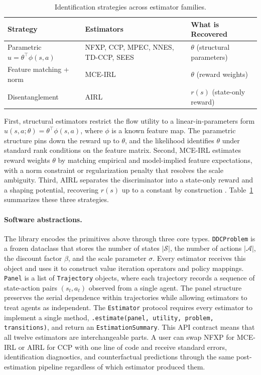 \begin{table}[H]
\centering
\small
\caption{Identification strategies across estimator families.}
\label{tab:identification}
\begin{tabular}{lll}
\toprule
Strategy & Estimators & What is Recovered \\
\midrule
Parametric $u = \theta^\top \phi(s,a)$ & NFXP, CCP, MPEC, NNES, TD-CCP, SEES & $\theta$ (structural parameters) \\
Feature matching + norm & MCE-IRL & $\theta$ (reward weights) \\
Disentanglement & AIRL & $r(s)$ (state-only reward) \\
\bottomrule
\end{tabular}
\end{table}

First, structural estimators restrict the flow utility to a linear-in-parameters form $u(s,a;\theta) = \theta^\top \phi(s,a)$, where $\phi$ is a known feature map. The parametric structure pins down the reward up to $\theta$, and the likelihood identifies $\theta$ under standard rank conditions on the feature matrix. Second, MCE-IRL estimates reward weights $\theta$ by matching empirical and model-implied feature expectations, with a norm constraint or regularization penalty that resolves the scale ambiguity. Third, AIRL separates the discriminator into a state-only reward and a shaping potential, recovering $r(s)$ up to a constant by construction \citep{fu2018}. Table~\ref{tab:identification} summarizes these three strategies.

\paragraph{Software abstractions.}
The library encodes the primitives above through three core types. \texttt{DDCProblem} is a frozen dataclass that stores the number of states $|\mathcal{S}|$, the number of actions $|\mathcal{A}|$, the discount factor $\beta$, and the scale parameter $\sigma$. Every estimator receives this object and uses it to construct value iteration operators and policy mappings. \texttt{Panel} is a list of \texttt{Trajectory} objects, where each trajectory records a sequence of state-action pairs $(s_t, a_t)$ observed from a single agent. The panel structure preserves the serial dependence within trajectories while allowing estimators to treat agents as independent. The \texttt{Estimator} protocol requires every estimator to implement a single method, \texttt{.estimate(panel, utility, problem, transitions)}, and return an \texttt{EstimationSummary}. This API contract means that all twelve estimators are interchangeable parts. A user can swap NFXP for MCE-IRL or AIRL for CCP with one line of code and receive standard errors, identification diagnostics, and counterfactual predictions through the same post-estimation pipeline regardless of which estimator produced them.
